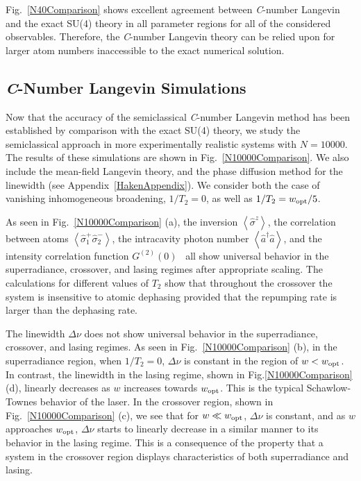 \documentclass[aps,
twocolumn,
showpacs,
superscriptaddress,groupedaddress]{revtex4}
\begin{document}
Fig.~\ref{N40Comparison} shows excellent agreement between {\it
  C}-number Langevin and the exact SU(4) theory in all parameter
regions for all of the considered observables.  Therefore, the {\it
  C}-number Langevin theory can be relied upon for larger atom numbers
inaccessible to the exact numerical solution.

\subsection{{\em C}-Number Langevin Simulations}

Now that the accuracy of the semiclassical {\it C}-number Langevin
method has been established by comparison with the exact SU(4) theory,
we study the semiclassical approach in more experimentally realistic
systems with $N=10000$. The results of these simulations are shown in
Fig.~\ref{N10000Comparison}.  We also include the mean-field Langevin
theory, and the phase diffusion method for the linewidth (see
Appendix~\ref{HakenAppendix}). We consider both the case of vanishing
inhomogeneous broadening, $1/T_2=0$, as well as $1/T_2=w_{\rm opt}/5$.

As seen in Fig.~\ref{N10000Comparison} (a), the inversion
$\left<\hat{\sigma}^{z}\right>$, the correlation between atoms
$\left<\hat{\sigma}_{1}^{+} \hat{\sigma}_{2}^{-}\right>$, the
intracavity photon number $\left<\hat{a}^{\dagger}\hat{a}\right>$, and
the intensity correlation function
$G^{(2)}(0)$~\cite{meystre2007elements} all show universal behavior in
the superradiance, crossover, and lasing regimes after appropriate
scaling.  The calculations for different values of $T_2$ show that
throughout the crossover the system is insensitive to atomic dephasing
provided that the repumping rate is larger than the dephasing rate.

The linewidth $\Delta \nu$ does not show universal behavior in the
superradiance, crossover, and lasing regimes. As seen in
Fig.~\ref{N10000Comparison} (b), in the superradiance region, when
$1/T_2=0$, $\Delta \nu$ is constant in the region of $w<w_{\rm opt}$.
In contrast, the linewidth in the lasing regime, shown in
Fig.\ref{N10000Comparison} (d), linearly decreases as $w$ increases
towards $w_{\rm opt}$. This is the typical Schawlow-Townes behavior of
the laser. In the crossover region, shown in
Fig.~\ref{N10000Comparison} (c), we see that for $w\ll w_{\rm opt}$,
$\Delta \nu$ is constant, and as $w$ approaches $w_{\rm opt}$,
$\Delta \nu$ starts to linearly decrease in a similar manner to its
behavior in the lasing regime. This is a consequence of the property
that a system in the crossover region displays characteristics of both
superradiance and lasing.
\end{document}
